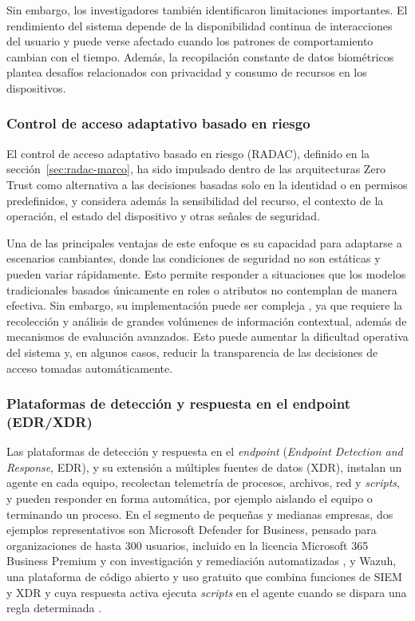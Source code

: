 Sin embargo, los investigadores también identificaron limitaciones importantes. El rendimiento del sistema depende de la disponibilidad continua de interacciones del usuario y puede verse afectado cuando los patrones de comportamiento cambian con el tiempo. Además, la recopilación constante de datos biométricos plantea desafíos relacionados con privacidad y consumo de recursos en los dispositivos.

\subsubsection{Control de acceso adaptativo basado en riesgo}
El control de acceso adaptativo basado en riesgo (RADAC), definido en la sección~\ref{sec:radac-marco}, ha sido impulsado dentro de las arquitecturas Zero Trust como alternativa a las decisiones basadas solo en la identidad o en permisos predefinidos, y considera además la sensibilidad del recurso, el contexto de la operación, el estado del dispositivo y otras señales de seguridad.

Una de las principales ventajas de este enfoque es su capacidad para adaptarse a escenarios cambiantes, donde las condiciones de seguridad no son estáticas y pueden variar rápidamente. Esto permite responder a situaciones que los modelos tradicionales basados únicamente en roles o atributos no contemplan de manera efectiva. Sin embargo, su implementación puede ser compleja \parencite{Xiao2022}, ya que requiere la recolección y análisis de grandes volúmenes de información contextual, además de mecanismos de evaluación avanzados. Esto puede aumentar la dificultad operativa del sistema y, en algunos casos, reducir la transparencia de las decisiones de acceso tomadas automáticamente.

\subsubsection{Plataformas de detección y respuesta en el endpoint (EDR/XDR)}\label{sec:ea-edr}
Las plataformas de detección y respuesta en el \emph{endpoint} (\emph{Endpoint Detection and Response}, EDR), y su extensión a múltiples fuentes de datos (XDR), instalan un agente en cada equipo, recolectan telemetría de procesos, archivos, red y \emph{scripts}, y pueden responder en forma automática, por ejemplo aislando el equipo o terminando un proceso. En el segmento de pequeñas y medianas empresas, dos ejemplos representativos son Microsoft Defender for Business, pensado para organizaciones de hasta 300 usuarios, incluido en la licencia Microsoft 365 Business Premium y con investigación y remediación automatizadas \parencite{MicrosoftDefenderBusiness}, y Wazuh, una plataforma de código abierto y uso gratuito que combina funciones de SIEM y XDR y cuya respuesta activa ejecuta \emph{scripts} en el agente cuando se dispara una regla determinada \parencite{WazuhActiveResponse}.


